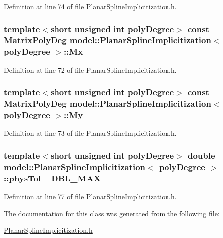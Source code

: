 Definition at line 74 of file Planar\+Spline\+Implicitization.\+h.

\hypertarget{classmodel_1_1_planar_spline_implicitization_aca2c04c2803bbe1ba25449106f66c04b}{}
\subsubsection[{Mx}]{\setlength{\rightskip}{0pt plus 5cm}template$<$short unsigned int poly\+Degree$>$ const Matrix\+Poly\+Deg {\bf model\+::\+Planar\+Spline\+Implicitization}$<$ poly\+Degree $>$\+::Mx}\label{classmodel_1_1_planar_spline_implicitization_aca2c04c2803bbe1ba25449106f66c04b}


Definition at line 72 of file Planar\+Spline\+Implicitization.\+h.

\hypertarget{classmodel_1_1_planar_spline_implicitization_a1fb0a787fa04ff39dadaf2121ee908d5}{}
\subsubsection[{My}]{\setlength{\rightskip}{0pt plus 5cm}template$<$short unsigned int poly\+Degree$>$ const Matrix\+Poly\+Deg {\bf model\+::\+Planar\+Spline\+Implicitization}$<$ poly\+Degree $>$\+::My}\label{classmodel_1_1_planar_spline_implicitization_a1fb0a787fa04ff39dadaf2121ee908d5}


Definition at line 73 of file Planar\+Spline\+Implicitization.\+h.

\hypertarget{classmodel_1_1_planar_spline_implicitization_afa18c9543f9fad949a91ed04ff1ca4f9}{}
\subsubsection[{phys\+Tol}]{\setlength{\rightskip}{0pt plus 5cm}template$<$short unsigned int poly\+Degree$>$ double {\bf model\+::\+Planar\+Spline\+Implicitization}$<$ poly\+Degree $>$\+::phys\+Tol =D\+B\+L\+\_\+\+M\+A\+X\hspace{0.3cm}{\ttfamily [static]}}\label{classmodel_1_1_planar_spline_implicitization_afa18c9543f9fad949a91ed04ff1ca4f9}


Definition at line 77 of file Planar\+Spline\+Implicitization.\+h.



The documentation for this class was generated from the following file\+:\begin{DoxyCompactItemize}
\item 
\hyperlink{_planar_spline_implicitization_8h}{Planar\+Spline\+Implicitization.\+h}\end{DoxyCompactItemize}
